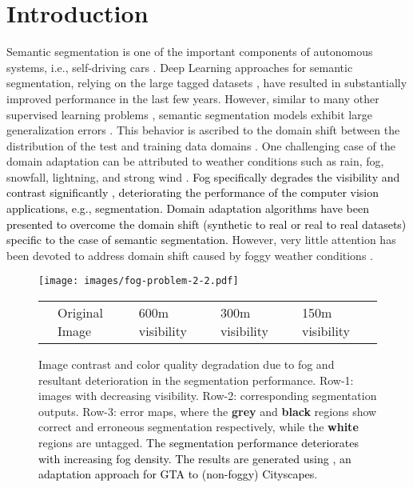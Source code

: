 \documentclass[final,5p,times,twocolumn]{elsarticle}
\begin{document}
\section{Introduction}
\label{intro}


Semantic segmentation is one of the important components of autonomous systems, i.e., self-driving cars \cite{kitty2012we}. 
Deep Learning approaches for semantic segmentation, relying on the large tagged datasets \cite{Cordts2016Cityscapes, Ros_2016_CVPR}, have resulted in substantially improved performance \cite{sakaridis2018semantic, zhao2017pyramid, chen2018deeplab} in the last few years.
However, similar to many other supervised learning problems \cite{khodabandeh2019robust, marsde2018people}, semantic segmentation models exhibit large generalization errors \cite{zou2018unsupervised, vu2019advent, LSE_2020_Naseer}.
This behavior is ascribed to the domain shift between the distribution of the test and training data domains \cite{curr2017_ICCV, Lian_2019_pycda}. 
One challenging case of the domain adaptation can be attributed to weather conditions such as rain, fog, snowfall, lightning, and strong wind \cite{chen2019gated, sakaridis2018semantic, vachmanus2020semantic}. \textcolor{black}{Fog specifically degrades the visibility and contrast significantly \cite{narasimhan2003contrast,tan2008visibility}, deteriorating the performance of the computer vision applications, e.g., segmentation. 
Domain adaptation algorithms have been presented to overcome the domain shift (synthetic to real \cite{tsai2018learning, zou2018unsupervised, mlsl2020} or real to real \cite{chen2017no} datasets)  specific to the case of semantic segmentation.}
However, very little attention has been devoted to address domain shift caused by foggy weather conditions \cite{sakaridis2018model, sakaridis2018semantic, dai2019curriculum}.




\begin{figure*}[t]
 	\centering
\texttt{[image: images/fog-problem-2-2.pdf]}
 	\scriptsize
\begin{tabular}{P{0.01cm}P{2.6cm}P{2.6cm}P{2.5cm}P{2.4cm}}
    & Original Image & 600m visibility & 300m visibility &150m visibility
    \end{tabular}
\caption{Image contrast and color quality degradation due to fog and resultant deterioration in the segmentation performance. Row-1: images with decreasing visibility. Row-2: corresponding segmentation outputs. Row-3: error maps, where the \textbf{grey} and \textbf{black} regions show correct and erroneous segmentation respectively, while the \textbf{white} regions are untagged. \textcolor{black}{ The segmentation performance deteriorates with increasing fog density. The results are generated using \cite{mlsl2020}, an adaptation approach for GTA to (non-foggy) Cityscapes}.
}
 
 	\label{img:intro}
\end{figure*}
\end{document}
